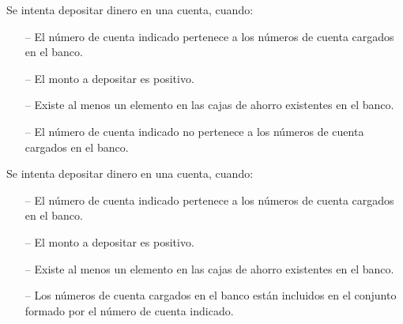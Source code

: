 \begin{tcolorbox}[colback=gray!5!white,colframe=gray!50!black,
  colbacktitle=gray!75!black,title=Depositar\_SP\_6]
  Se intenta depositar dinero en una cuenta, cuando:
     \begin{itemize}
        \item[--]{El número de cuenta indicado pertenece a los números de cuenta cargados en el banco.}
        \item[--]{El monto a depositar es positivo.}
        \item[--]{Existe al menos un elemento en las cajas de ahorro existentes en el banco.}
        \item[--]{El número de cuenta indicado no pertenece a los números de cuenta cargados en el banco.}
     \end{itemize}
\end{tcolorbox}



\begin{tcolorbox}[colback=gray!5!white,colframe=gray!50!black,
  colbacktitle=gray!75!black,title=Depositar\_SP\_7]
  Se intenta depositar dinero en una cuenta, cuando:
     \begin{itemize}
        \item[--]{El número de cuenta indicado pertenece a los números de cuenta cargados en el banco.}
        \item[--]{El monto a depositar es positivo.}
        \item[--]{Existe al menos un elemento en las cajas de ahorro existentes en el banco.}
        \item[--]{Los números de cuenta cargados en el banco están incluidos en el conjunto formado por el número de cuenta indicado.}
     \end{itemize}
\end{tcolorbox}



